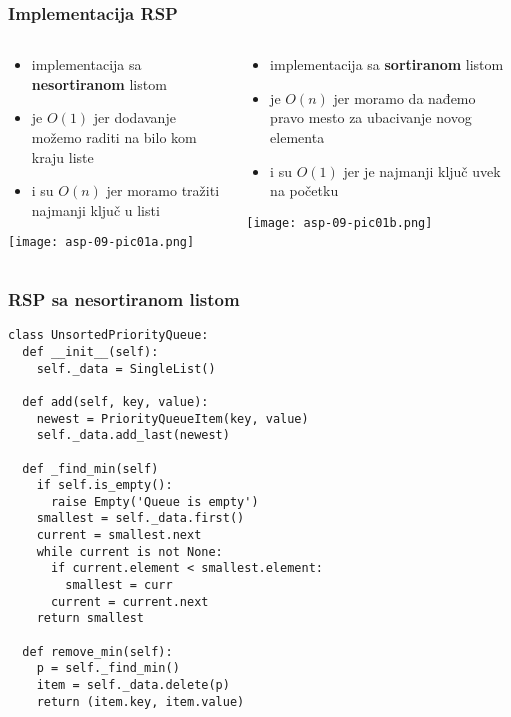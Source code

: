\documentclass[compress,aspectratio=169]{beamer}
\begin{document}
\begin{frame}[fragile]
\frametitle{Implementacija RSP}
\begin{columns}
  \begin{column}[c]{5.5cm}
    \begin{itemize}
      \item implementacija sa \textbf{nesortiranom} listom
      \item {} je $O(1)$ jer dodavanje možemo raditi na bilo kom kraju liste
      \item {} i  su $O(n)$ jer moramo tražiti najmanji ključ u listi
    \end{itemize}
    \begin{center}
      \texttt{[image: asp-09-pic01a.png]}
    \end{center}
  \end{column}
  \begin{column}[c]{5.5cm}
    \begin{itemize}
      \item implementacija sa \textbf{sortiranom} listom
      \item {} je $O(n)$ jer moramo da nađemo pravo mesto za ubacivanje novog elementa
      \item {} i  su $O(1)$ jer je najmanji ključ uvek na početku
    \end{itemize}
    \begin{center}
      \texttt{[image: asp-09-pic01b.png]}
    \end{center}
  \end{column}
\end{columns}
\end{frame}

\begin{frame}
  \frametitle{RSP sa nesortiranom listom}
\begin{verbatim}
class UnsortedPriorityQueue:
  def __init__(self):
    self._data = SingleList()
    
  def add(self, key, value):
    newest = PriorityQueueItem(key, value) 
    self._data.add_last(newest)
    
  def _find_min(self)
    if self.is_empty():
      raise Empty('Queue is empty')
    smallest = self._data.first()
    current = smallest.next
    while current is not None:
      if current.element < smallest.element:
        smallest = curr
      current = current.next
    return smallest
  
  def remove_min(self):
    p = self._find_min()
    item = self._data.delete(p)
    return (item.key, item.value)
\end{verbatim}
\end{frame}
\end{document}

